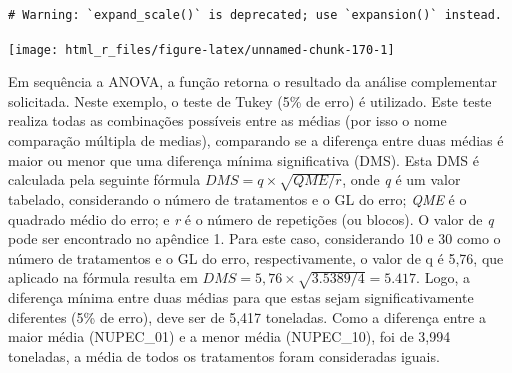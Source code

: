 \documentclass[
]{book}
\begin{document}
\begin{verbatim}
# Warning: `expand_scale()` is deprecated; use `expansion()` instead.
\end{verbatim}

\begin{center}\texttt{[image: html\_r\_files/figure-latex/unnamed-chunk-170-1]} \end{center}

Em sequência a ANOVA, a função retorna o resultado da análise complementar solicitada. Neste exemplo, o teste de Tukey (5\% de erro) é utilizado. Este teste realiza todas as combinações possíveis entre as médias (por isso o nome comparação múltipla de medias), comparando se a diferença entre duas médias é maior ou menor que uma diferença mínima significativa (DMS). Esta DMS é calculada pela seguinte fórmula \(DMS = q \times \sqrt{QME/r}\), onde \emph{q} é um valor tabelado, considerando o número de tratamentos e o GL do erro; \emph{QME} é o quadrado médio do erro; e \emph{r} é o número de repetições (ou blocos). O valor de \emph{q} pode ser encontrado no apêndice 1. Para este caso, considerando 10 e 30 como o número de tratamentos e o GL do erro, respectivamente, o valor de q é 5,76, que aplicado na fórmula resulta em \(DMS = 5,76 \times \sqrt{3.5389/4}=5.417\). Logo, a diferença mínima entre duas médias para que estas sejam significativamente diferentes (5\% de erro), deve ser de 5,417 toneladas. Como a diferença entre a maior média (NUPEC\_01) e a menor média (NUPEC\_10), foi de 3,994 toneladas, a média de todos os tratamentos foram consideradas iguais.
\end{document}
